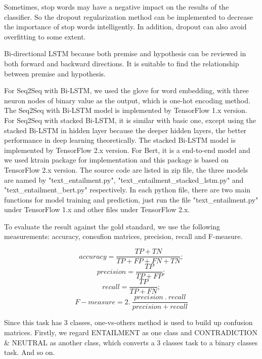 \documentclass{article}
\begin{document}
Sometimes, stop words may have a negative impact on the results of the classifier. So the dropout regularization method can be implemented to decrease the importance of stop words intelligently. In addition, dropout can also avoid overfitting to some extent.

Bi-directional LSTM because both premise and hypothesis can be reviewed in both forward and backward directions. It is suitable to find the relationship between premise and hypothesis.

For Seq2Seq with Bi-LSTM, we used the glove for word embedding, with three neuron nodes of binary value as the output, which is one-hot encoding method. The Seq2Seq with Bi-LSTM model is implemented by TensorFlow 1.x version. For Seq2Seq with stacked Bi-LSTM, it is similar with basic one, except using the stacked Bi-LSTM in hidden layer because the deeper hidden layers, the better performance in deep learning theoretically. The stacked Bi-LSTM model is implemented by TensorFlow 2.x version. For Bert, it is a end-to-end model and we used ktrain package for implementation and this package is based on TensorFlow 2.x version. The source code are listed in zip file, the three models are named by "text\_entailment.py", "text\_entailment\_stacked\_lstm.py" and "text\_entailment\_bert.py" respectively. In each python file, there are two main functions for model training and prediction, just run the file "text\_entailment.py" under TensorFlow 1.x and other files under TensorFlow 2.x.

To evaluate the result against the gold standard, we use the following measurements:  accuracy, consufion matrices, precision, recall and F-measure.

\begin{equation}
accuracy=\frac{TP+TN}{TP+FP+FN+TN};
\end{equation}
\begin{equation}
precision=\frac{TP}{TP+FP};
\end{equation}
\begin{equation}
recall=\frac{TP}{TP+FN};
\end{equation}
\begin{equation}
F-measure=2.\: \frac{precision\: .\: recall}{precision+recall}
\end{equation}

Since this task has 3 classes, one-vs-others method is used to build up confusion matrices. Firstly, we regard ENTAILMENT as one class and CONTRADICTION \& NEUTRAL as another class, which converts a 3 classes task to a binary classes task. And so on.
\end{document}
